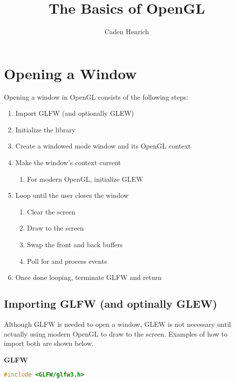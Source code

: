 \documentclass{article}
\title{The Basics of OpenGL}
\author{Caden Henrich}
\begin{document}
\maketitle

\newpage
\tableofcontents
\newpage

\section{Opening a Window}

Opening a window in OpenGL consists of the following steps: 

\begin{enumerate}
    \item {Import GLFW (and optionally GLEW)}
    \item {Initialize the library}
    \item {Create a windowed mode window and its OpenGL context}
    \item {Make the window's context current}
    \begin{enumerate}
        \item {For modern OpenGL, initialize GLEW}
    \end{enumerate}
    \item {Loop until the user closes the window}
    \begin {enumerate}
        \item {Clear the screen}
        \item {Draw to the screen}
        \item {Swap the front and back buffers}
        \item {Poll for and process events}
    \end{enumerate}
    \item {Once done looping, terminate GLFW and return}
\end{enumerate}

\subsection{Importing GLFW (and optinally GLEW)}

Although GLFW is needed to open a window, GLEW is not necessary until actually using modern OpenGL to draw to the screen. Examples of how to import both are shown below.

\medskip

\textbf{GLFW}

\begin{lstlisting}[language=C++]
#include <GLFW/glfw3.h>
\end{lstlisting}
\end{document}
